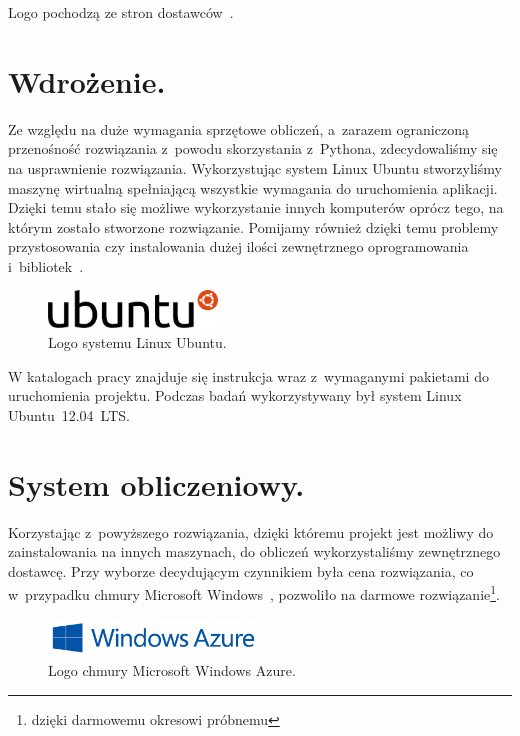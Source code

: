 \documentclass[twoside,12pt]{report}
\begin{document}
Logo pochodzą ze stron dostawców~\cite{java, eclipse, python,pydev}.

\section{Wdrożenie.}

Ze względu na duże wymagania sprzętowe obliczeń, a~zarazem ograniczoną przenośność rozwiązania z~powodu skorzystania z~Pythona, zdecydowaliśmy się na usprawnienie rozwiązania. Wykorzystując system Linux Ubuntu stworzyliśmy maszynę wirtualną spełniającą wszystkie wymagania do uruchomienia aplikacji. Dzięki temu stało się możliwe wykorzystanie innych komputerów oprócz tego, na którym zostało stworzone rozwiązanie. Pomijamy również dzięki temu problemy przystosowania czy instalowania dużej ilości zewnętrznego oprogramowania i~bibliotek~\cite{ubuntu}.

\begin{figure}[ht]
\centering
\includegraphics[width=0.4\textwidth]{img/ubuntu}
\caption{Logo systemu Linux Ubuntu.}
\end{figure}

W katalogach pracy znajduje się instrukcja wraz z~wymaganymi pakietami do uruchomienia projektu. Podczas badań wykorzystywany był system Linux Ubuntu~12.04~LTS.

\section{System obliczeniowy.}

Korzystając z~powyższego rozwiązania, dzięki któremu projekt jest możliwy do zainstalowania na innych maszynach, do obliczeń wykorzystaliśmy zewnętrznego dostawcę. Przy wyborze decydującym czynnikiem była cena rozwiązania, co w~przypadku chmury Microsoft Windows~\cite{azure}, pozwoliło na darmowe rozwiązanie\footnote{dzięki darmowemu okresowi próbnemu}.

\begin{figure}[ht]
\centering
\includegraphics[width=0.5\textwidth]{img/azure}
\caption{Logo chmury Microsoft Windows Azure.}
\end{figure}
\end{document}
